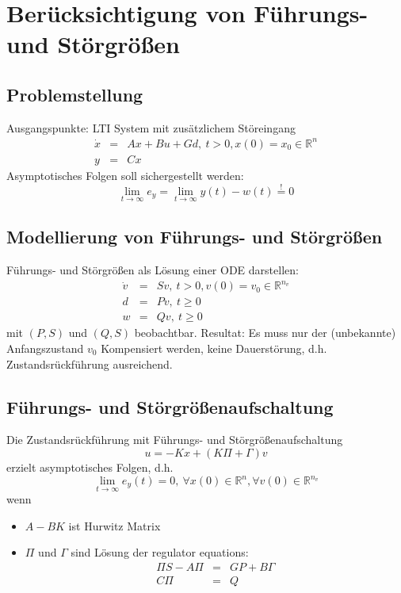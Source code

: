 \chapter{Berücksichtigung von Führungs- und Störgrößen}
\section{Problemstellung}
Ausgangspunkte: LTI System mit zusätzlichem Störeingang
\begin{eqnarray}
    \dot{x} &=& Ax + Bu + Gd,\ t>0, x(0)=x_0 \in \mathbb{R}^n \\
    y &=& C x
\end{eqnarray}
Asymptotisches Folgen soll sichergestellt werden:
\begin{equation}
    \lim_{t \to \infty} e_y = \lim_{t \to \infty} y(t) - w(t) \stackrel{!}{=} 0 
\end{equation}

\section{Modellierung von Führungs- und Störgrößen}
Führungs- und Störgrößen als Lösung einer ODE darstellen:
\begin{eqnarray}
    \dot{v} &=& Sv,\ t>0, v(0)=v_0\in \mathbb{R}^{n_v} \\
    d &=& Pv,\ t \geq 0 \\
    w &=& Qv,\ t \geq 0
\end{eqnarray} 
mit $(P,S)$ und $(Q,S)$ beobachtbar. Resultat: Es muss nur der (unbekannte) Anfangszustand
$v_0$ Kompensiert werden, keine Dauerstörung, d.h. Zustandsrückführung ausreichend.


\section{Führungs- und Störgrößenaufschaltung}
Die Zustandsrückführung mit Führungs- und Störgrößenaufschaltung
\begin{equation}
    u = -Kx + (K \Pi + \Gamma) v
\end{equation}
erzielt asymptotisches Folgen, d.h.
\begin{equation}
    \lim_{t \to \infty} e_y(t) = 0,\ \forall x(0) \in \mathbb{R}^n, \forall v(0) \in
        \mathbb{R}^{n_v}
\end{equation}
wenn
\begin{itemize}
    \item $A-BK$ ist Hurwitz Matrix
    \item $\Pi$ und $\Gamma$ sind Lösung der \glqq{}regulator equations\grqq{}:
        \begin{eqnarray}
            \Pi S - A \Pi &=& GP + B \Gamma \\
            C \Pi &=& Q
        \end{eqnarray}
\end{itemize}

